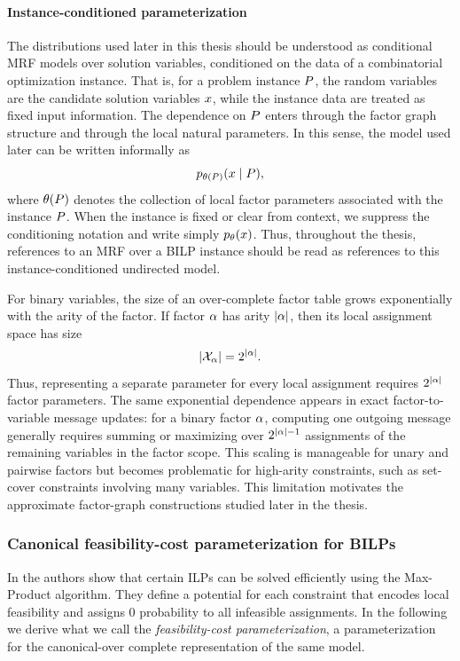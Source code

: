 \paragraph{Instance-conditioned parameterization}
The distributions used later in this thesis should be understood as conditional MRF models over solution variables, conditioned on the data of a combinatorial optimization instance. That is, for a problem instance $P$, the random variables are the candidate solution variables $x$, while the instance data are treated as fixed input information. The dependence on $P$ enters through the factor graph structure and through the local natural parameters. In this sense, the model used later can be written informally as
\begin{equation*}
    p_{\theta(P)}(x \mid P),
\end{equation*}
where $\theta(P)$ denotes the collection of local factor parameters associated with the instance $P$. When the instance is fixed or clear from context, we suppress the conditioning notation and write simply $p_{\theta}(x)$. Thus, throughout the thesis, references to an MRF over a BILP instance should be read as references to this instance-conditioned undirected model.

For binary variables, the size of an over-complete factor table grows exponentially with the arity of the factor. If factor $\alpha$ has arity $|\alpha|$, then its local assignment space has size
\begin{equation*}
|\mathcal{X}_{\alpha}| = 2^{|\alpha|}.
\end{equation*}
Thus, representing a separate parameter for every local assignment requires $2^{|\alpha|}$ factor parameters. The same exponential dependence appears in exact factor-to-variable message updates: for a binary factor $\alpha$, computing one outgoing message generally requires summing or maximizing over $2^{|\alpha|-1}$ assignments of the remaining variables in the factor scope. This scaling is manageable for unary and pairwise factors but becomes problematic for high-arity constraints, such as set-cover constraints involving many variables. This limitation motivates the approximate factor-graph constructions studied later in the thesis.

\subsubsection{Canonical feasibility-cost parameterization for BILPs}
\label{subsec:canonical-feasibility-cost-param}
In \citep{park_max-product_2017} the authors show that certain ILPs can be solved efficiently using the Max-Product algorithm. They define a potential for each constraint that encodes local feasibility and assigns $0$ probability to all infeasible assignments. In the following we derive what we call the \emph{feasibility-cost parameterization}, a parameterization for the canonical-over complete representation of the same model. 

